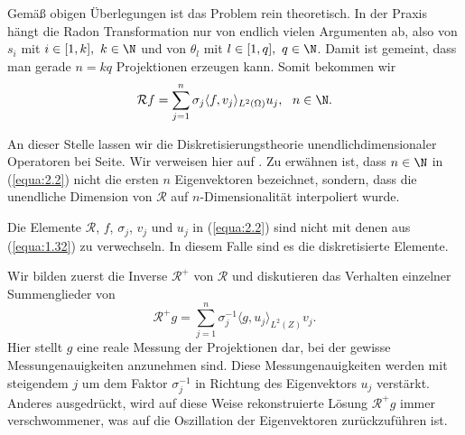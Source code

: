 Gemäß obigen Überlegungen ist das Problem rein theoretisch. In der Praxis hängt die Radon Transformation nur von endlich vielen Argumenten ab, also von $s_i$ mit $i \in [1,k], \ k \in \N$ und  von $\theta_l$ mit $l \in [1,q], \ q \in \N$. Damit ist gemeint, dass man gerade $n = kq$ Projektionen erzeugen kann. Somit bekommen wir
\begin{equation}
	\mathcal{R}f = \sum\limits_{j = 1}^{n} \sigma_j \langle f, v_j\rangle_{L^2(\Omega)} u_j, \ \ n \in \N.
	\label{equa:2.2}
\end{equation}
\begin{Bemerkung}
	An dieser Stelle lassen wir die Diskretisierungstheorie unendlichdimensionaler Operatoren bei Seite. Wir verweisen hier auf \cite[S. 153]{Rieder03}. Zu erwähnen ist, dass $n \in \N$ in (\ref{equa:2.2}) nicht die ersten $n$ Eigenvektoren bezeichnet, sondern, dass die unendliche Dimension von $\mathcal{R}$ auf $n$-Dimensionalität interpoliert wurde.
	\label{bem:4}
\end{Bemerkung}
\begin{Bemerkung}
	Die Elemente $\mathcal{R}$, $f$, $\sigma_j$, $v_j$ und $u_j$ in (\ref{equa:2.2}) sind nicht mit denen aus (\ref{equa:1.32}) zu verwechseln. In diesem Falle sind es die diskretisierte Elemente.
	\label{bem:5}
\end{Bemerkung}
Wir bilden zuerst die Inverse $\mathcal{R}^{+}$ von $\mathcal{R}$ und diskutieren das Verhalten einzelner Summenglieder von
\begin{equation}
	\mathcal{R}^{+} g  = \sum\limits_{j = 1}^{n} \sigma_j^{-1} \langle g, u_j \rangle_{L^2(Z)} v_j.
	\label{equa:2.3}
\end{equation}
Hier stellt $g$ eine reale Messung der Projektionen dar, bei der gewisse Messungenauigkeiten anzunehmen sind. Diese Messungenauigkeiten werden mit steigendem $j$ um dem Faktor $\sigma_j^{-1}$ in Richtung des Eigenvektors $u_j$ verstärkt. Anderes ausgedrückt, wird auf diese Weise rekonstruierte Lösung $\mathcal{R}^{+} g$ immer verschwommener, was auf die Oszillation der Eigenvektoren zurückzuführen ist.

